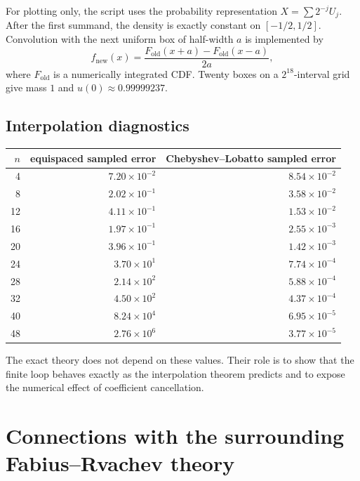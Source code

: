 \documentclass[11pt,oneside]{article}
\theoremstyle{definition}
\theoremstyle{remark}
\newcommand{\1}{\mathbf{1}}
\begin{document}
For plotting only, the script uses the probability representation
$X=\sum2^{-j}U_j$.  After the first summand, the density is exactly constant
on $[-1/2,1/2]$.  Convolution with the next uniform box of half-width $a$ is
implemented by
\begin{equation}
 f_{\mathrm{new}}(x)=\frac{F_{\mathrm{old}}(x+a)-F_{\mathrm{old}}(x-a)}{2a},
 \label{eq:box-average}
\end{equation}
where $F_{\mathrm{old}}$ is a numerically integrated CDF.  Twenty boxes on a
$2^{18}$-interval grid give mass $1$ and $u(0)\approx0.99999237$.

\subsection{Interpolation diagnostics}

\begin{center}
\begin{tabular}{rrr}
\toprule
$n$ & equispaced sampled error & Chebyshev--Lobatto sampled error\\
\midrule
4  & $7.20\times10^{-2}$ & $8.54\times10^{-2}$\\
8  & $2.02\times10^{-1}$ & $3.58\times10^{-2}$\\
12 & $4.11\times10^{-1}$ & $1.53\times10^{-2}$\\
16 & $1.97\times10^{-1}$ & $2.55\times10^{-3}$\\
20 & $3.96\times10^{-1}$ & $1.42\times10^{-3}$\\
24 & $3.70\times10^{1}$  & $7.74\times10^{-4}$\\
28 & $2.14\times10^{2}$  & $5.88\times10^{-4}$\\
32 & $4.50\times10^{2}$  & $4.37\times10^{-4}$\\
40 & $8.24\times10^{4}$  & $6.95\times10^{-5}$\\
48 & $2.76\times10^{6}$  & $3.77\times10^{-5}$\\
\bottomrule
\end{tabular}
\end{center}

The exact theory does not depend on these values.  Their role is to show that
the finite loop behaves exactly as the interpolation theorem predicts and to
expose the numerical effect of coefficient cancellation.

\section{Connections with the surrounding Fabius--Rvachev theory}
\label{sec:connections}
\end{document}
